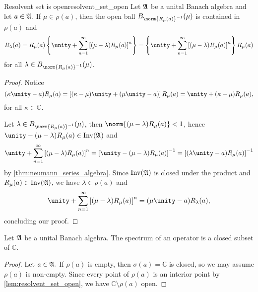 \begin{lemma}{Resolvent set is open}{resolvent_set_open}
    Let \(\mathfrak{A}\) be a unital Banach algebra and let \(a \in \mathfrak{A}\). If \(\mu \in \rho(a)\), then the open ball \(B_{\norm{R_\mu(a)}^{-1}}(\mu)\) is contained in \(\rho(a)\) and
    \begin{equation*}
        R_{\lambda}(a) = R_\mu(a)\left\{\unity + \sum_{n = 1}^{\infty} \left[(\mu - \lambda)R_\mu(a)\right]^n\right\} = \left\{\unity + \sum_{n = 1}^{\infty}\left[(\mu - \lambda)R_\mu(a)\right]^n\right\}R_{\mu}(a)
    \end{equation*}
    for all \(\lambda \in B_{\norm{R_\mu(a)}^{-1}}(\mu)\).
\end{lemma}
\begin{proof}
    Notice
    \begin{equation*}
        (\kappa \unity - a)R_\mu(a) = \left[(\kappa - \mu)\unity + (\mu \unity - a)\right]R_{\mu}(a) = \unity + (\kappa - \mu)R_{\mu}(a),
    \end{equation*}
    for all \(\kappa \in \mathbb{C}\).

    Let \(\lambda \in B_{\norm{R_\mu(a)}^{-1}}(\mu)\), then \(\norm{(\mu - \lambda)R_{\mu}(a)} < 1\), hence \(\unity - (\mu - \lambda)R_{\mu}(a) \in \invertible{\algebra{A}}\) and
    \begin{equation*}
        \unity + \sum_{n = 1}^{\infty} \left[(\mu - \lambda)R_\mu(a)\right]^n = \left[\unity - (\mu - \lambda)R_{\mu}(a)\right]^{-1} = \left[(\lambda \unity - a)R_\mu(a)\right]^{-1}
    \end{equation*}
    by \cref{thm:neumann_series_algebra}. Since \(\operatorname{Inv}(\mathfrak{A})\) is closed under the product and \(R_\mu(a) \in \operatorname{Inv}(\mathfrak{A})\), we have \(\lambda \in \rho(a)\) and
    \begin{equation*}
        \unity + \sum_{n = 1}^{\infty} \left[(\mu - \lambda)R_\mu(a)\right]^n = (\mu\unity - a)R_{\lambda}(a),
    \end{equation*}
    concluding our proof.
\end{proof}
\begin{corollary}
    Let \(\mathfrak{A}\) be a unital Banach algebra. The spectrum of an operator is a closed subset of \(\mathbb{C}\).
\end{corollary}
\begin{proof}
    Let \(a \in \mathfrak{A}.\) If \(\rho(a)\) is empty, then \(\sigma(a) = \mathbb{C}\) is closed, so we may assume \(\rho(a)\) is non-empty. Since every point of \(\rho(a)\) is an interior point by \cref{lem:resolvent_set_open}, we have \(\mathbb{C} \setminus \rho(a)\) open.
\end{proof}

